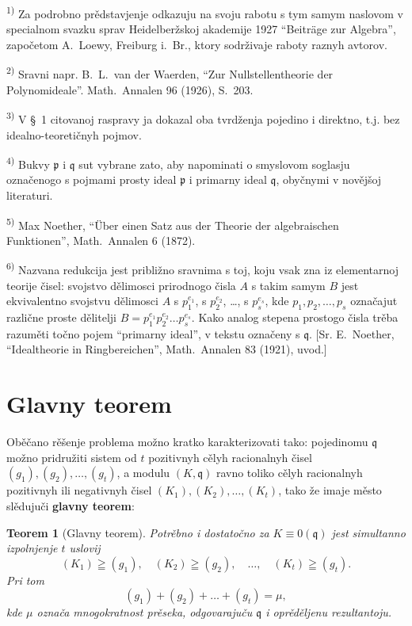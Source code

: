 \documentclass[11pt]{article}
\newcommand{\foreign}[1]{#1}
\theoremstyle{plain}
\newtheorem{satz}{Teorem}
\begin{document}
{\footnotesize
\textsuperscript{1)} Za podrobno prědstavjenje odkazuju na svoju rabotu s tym samym
naslovom v specialnom svazku sprav Heidelberžskoj akademije 1927
``\foreign{Beiträge zur Algebra}'', započetom \foreign{A.\ Loewy}, Freiburg i.\ Br., ktory
sodrživaje raboty raznyh avtorov.

\textsuperscript{2)} Sravni napr. \foreign{B.\ L.\ van der Waerden}, ``\foreign{Zur Nullstellentheorie der Polynomideale}''.
\foreign{Math.\ Annalen} 96 (1926), S.~203.

\textsuperscript{3)} V \S~1 citovanoj raspravy ja dokazal oba tvrdženja pojedino i direktno,
t.j. bez idealno-teoretičnyh pojmov.

\textsuperscript{4)} Bukvy $\mathfrak{p}$ i $\mathfrak{q}$ sut vybrane zato, aby napominati
o smyslovom soglasju označenogo s pojmami prosty ideal
$\mathfrak{p}$ i primarny ideal $\mathfrak{q}$, obyčnymi v novějšoj literaturi.

\textsuperscript{5)} \foreign{Max Noether}, ``\foreign{Über einen Satz aus der Theorie der algebraischen Funktionen}'',
\foreign{Math.\ Annalen} 6 (1872).

\textsuperscript{6)} Nazvana redukcija jest približno sravnima s toj, koju vsak zna iz
elementarnoj teorije čisel: svojstvo dělimosci prirodnogo čisla
$A$ s takim samym $B$ jest ekvivalentno svojstvu dělimosci $A$ s
$p_{1}^{e_{1}}$, s $p_{2}^{e_{2}}$, \ldots, s $p_{s}^{e_{s}}$, kde
$p_{1}, p_{2}, \ldots, p_{s}$ označajut različne proste dělitelji
$B = p_{1}^{e_{1}}p_{2}^{e_{2}} \ldots p_{s}^{e_{s}}$. Kako analog
stepena prostogo čisla trěba razuměti točno pojem ``primarny ideal'',
v tekstu označeny s $\mathfrak{q}$. [Sr. E.\ Noether,
``\foreign{Idealtheorie in Ringbereichen}'', \foreign{Math.\ Annalen} 83 (1921), uvod.]
}

\newpage
\section*{Glavny teorem}

Oběčano rěšenje problema možno kratko karakterizovati tako:
pojedinomu $\mathfrak{q}$ možno pridružiti sistem od $t$ pozitivnyh
cělyh racionalnyh čisel $(g_{1}), (g_{2}), \ldots, (g_{t})$, a
modulu $(K, \mathfrak{q})$ ravno toliko cělyh racionalnyh pozitivnyh
ili negativnyh čisel $(K_{1}), (K_{2}), \ldots, (K_{t})$, tako že
imaje město slědujuči \textbf{glavny teorem}:

\begin{satz}[Glavny teorem]\label{satz:kap-II}
Potrěbno i dostatočno za $K \equiv 0(\mathfrak{q})$ jest
simultanno izpolnjenje $t$ uslovij
\[
(K_1)\geqq(g_1),\quad (K_2)\geqq(g_2),\quad \ldots,\quad (K_t)\geqq(g_t).
\]
Pri tom
\[
(g_1)+(g_2)+\ldots+(g_t)=\mu,
\]
kde $\mu$ označa mnogokratnost prěseka, odgovarajuču
$\mathfrak{q}$ i oprěděljenu rezultantoju.
\end{satz}
\end{document}
